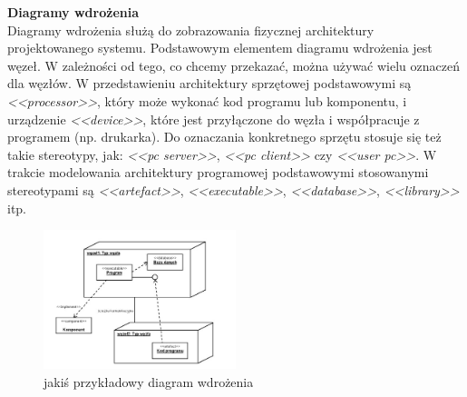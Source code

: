 \documentclass[a4paper,12pt,oneside]{book}
\begin{document}
				\textbf{Diagramy wdrożenia}\\
                Diagramy wdrożenia służą do zobrazowania fizycznej architektury projektowanego systemu. Podstawowym elementem diagramu wdrożenia jest węzeł. W zależności od tego, co chcemy przekazać, można używać wielu oznaczeń dla węzłów. W przedstawieniu architektury sprzętowej podstawowymi są \textit{<<processor>>}, który może wykonać kod programu lub komponentu, i urządzenie \textit{<<device>>}, które jest przyłączone do węzła i współpracuje z programem (np. drukarka). Do oznaczania konkretnego sprzętu stosuje się też takie stereotypy, jak: \textit{<<pc server>>}, \textit{<<pc client>>} czy \textit{<<user pc>>}. W trakcie modelowania architektury programowej podstawowymi stosowanymi stereotypami są \textit{<<artefact>>}, \textit{<<executable>>}, \textit{<<database>>}, \textit{<<library>>} itp.
                \begin{figure}[H]
                    \centering
                    \includegraphics[width=0.5\textwidth]{images/d_deploy.jpg}
                    \caption{jakiś przykładowy diagram wdrożenia}
                    \label{fig:twojastara46}
                \end{figure}
    
\end{document}
